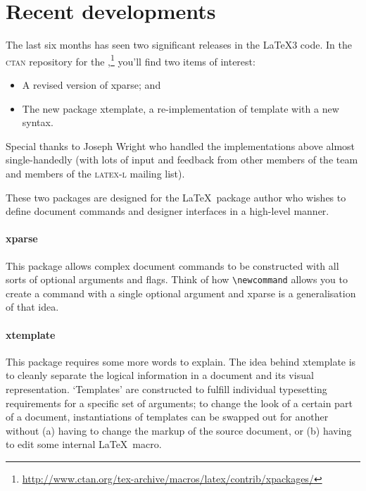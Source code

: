 \documentclass{ltnews}
\begin{document}
\maketitle
\raisefirstsection

\section{Recent developments}

The last six months has seen two significant releases in the \LaTeX3 code.
In the \textsc{ctan} repository for the ,\footnote{\url{http://www.ctan.org/tex-archive/macros/latex/contrib/xpackages/}} you'll find two items of interest:
\begin{itemize}
\item A revised version of \textsf{xparse}; and
\item The new package \textsf{xtemplate}, a re-implementation of \textsf{template} with a new syntax.
\end{itemize}
Special thanks to Joseph Wright who handled the implementations above almost single-handedly (with lots of input and feedback from other members of the team and members of the \textsc{latex-l} mailing list).

These two packages are designed for the \LaTeX\ package author who wishes to define document commands and designer interfaces in a high-level manner.

\paragraph{\textsf{xparse}}
This package allows complex document commands to be constructed with all sorts of optional arguments and flags. Think of how \verb|\newcommand| allows you to create a command with a single optional argument and \textsf{xparse} is a generalisation of that idea.

\paragraph{\textsf{xtemplate}}
This package requires some more words to explain. The idea behind
\textsf{xtemplate} is to cleanly separate the logical information in a
document and its visual representation. `Templates' are constructed to fulfill
individual typesetting requirements for a specific set of arguments; to change
the look of a certain part of a document, instantiations of templates can be
swapped out for another without (a) having to change the markup of the source
document, or (b) having to edit some internal \LaTeX\ macro.
\end{document}
